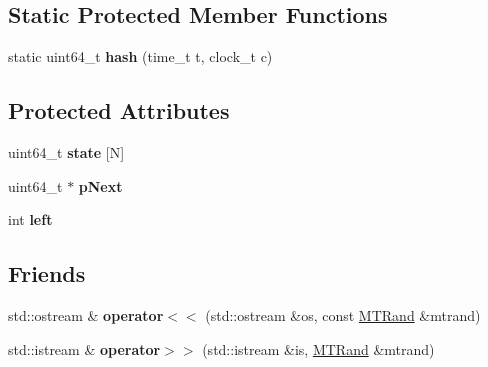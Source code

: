 \subsection*{Static Protected Member Functions}
\begin{DoxyCompactItemize}
\item 
\hypertarget{classMTRand_a1b1914765ae18effdd454ee5dc490855}{static uint64\-\_\-t {\bfseries hash} (time\-\_\-t t, clock\-\_\-t c)}\label{classMTRand_a1b1914765ae18effdd454ee5dc490855}

\end{DoxyCompactItemize}
\subsection*{Protected Attributes}
\begin{DoxyCompactItemize}
\item 
\hypertarget{classMTRand_ae78c2072cf0839ad367d3fedc2bb196e}{uint64\-\_\-t {\bfseries state} \mbox{[}N\mbox{]}}\label{classMTRand_ae78c2072cf0839ad367d3fedc2bb196e}

\item 
\hypertarget{classMTRand_a9710904ac4bfaf50aa058978f134e96b}{uint64\-\_\-t $\ast$ {\bfseries p\-Next}}\label{classMTRand_a9710904ac4bfaf50aa058978f134e96b}

\item 
\hypertarget{classMTRand_a98eabf568c88f121e44f487397f32495}{int {\bfseries left}}\label{classMTRand_a98eabf568c88f121e44f487397f32495}

\end{DoxyCompactItemize}
\subsection*{Friends}
\begin{DoxyCompactItemize}
\item 
\hypertarget{classMTRand_a059061d50a1e54ee3067d4e1dbdd7c64}{std\-::ostream \& {\bfseries operator$<$$<$} (std\-::ostream \&os, const \hyperlink{classMTRand}{M\-T\-Rand} \&mtrand)}\label{classMTRand_a059061d50a1e54ee3067d4e1dbdd7c64}

\item 
\hypertarget{classMTRand_a45b02a702835a3be42171c5c2dc79b2d}{std\-::istream \& {\bfseries operator$>$$>$} (std\-::istream \&is, \hyperlink{classMTRand}{M\-T\-Rand} \&mtrand)}\label{classMTRand_a45b02a702835a3be42171c5c2dc79b2d}

\end{DoxyCompactItemize}


